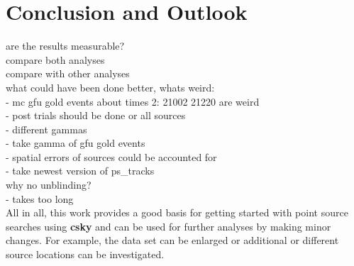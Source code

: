 \chapter{Conclusion and Outlook} \label{sec:outlook}
are the results measurable?\\
compare both analyses\\
compare with other analyses\\

what could have been done better, whats weird:\\
- mc gfu gold events about times 2: 21002 21220 are weird\\
- post trials should be done or all sources\\
- different gammas\\
- take gamma of gfu gold events\\
- spatial errors of sources could be accounted for\\
- take newest version of ps\_tracks\\
why no unblinding?\\
- takes too long\\

All in all, this work provides a good basis for getting started with point source searches using \textbf{csky} and can be used for further analyses by making minor changes.
For example, the data set can be enlarged or additional or different source locations can be investigated.
